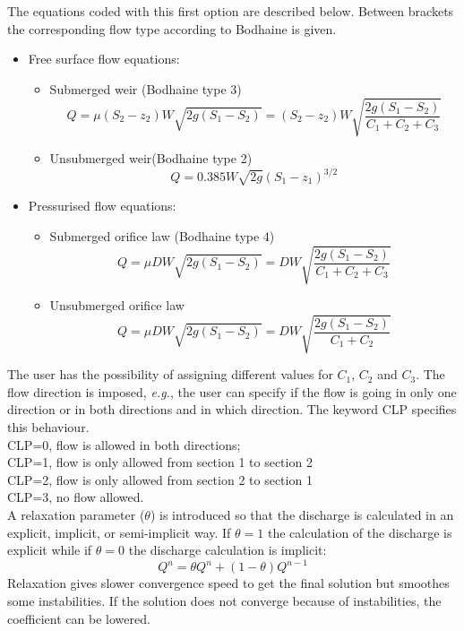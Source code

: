 The equations coded with this first option are described below.
Between brackets the corresponding flow type according to Bodhaine \cite{Bodhaine1968} is given.
\begin{itemize}
\item Free surface flow equations:
  \begin{itemize}
  \item Submerged weir (Bodhaine type 3)
    \begin{equation}
      Q=\mu (S_2-z_2) W \sqrt{2g(S_1-S_2 )} = (S_2-z_2) W \sqrt{\dfrac{2g(S_1-S_2)}{C_1+C_2+C_3}}
    \end{equation}
  \item Unsubmerged weir(Bodhaine type 2)
    \begin{equation}
      Q=0.385 W \sqrt{2g}(S_1-z_1)^{3/2}
    \end{equation}
  \end{itemize}
\item Pressurised flow equations:
  \begin{itemize}
  \item Submerged orifice law (Bodhaine type 4)
    \begin{equation}
      Q=\mu D W \sqrt{2g(S_1-S_2 )} = D W \sqrt{\dfrac{2g(S_1-S_2)}{C_1+C_2+C_3}}
    \end{equation}
  \item Unsubmerged orifice law
    \begin{equation}
    Q= \mu D W \sqrt{2g(S_1-S_2)} = D W \sqrt{\dfrac{2g(S_1-S_2)}{C_1+C_2}}
    \end{equation}
  \end{itemize}
\end{itemize}

The user has the possibility of assigning different values for $C_1$, $C_2$ and $C_3$.
The flow direction is imposed, \textit{e.g.}, the user can specify if the flow is going
in only one direction or in both directions and in which direction.
The keyword CLP specifies this behaviour.\\
CLP=0, flow is allowed in both directions;\\
CLP=1, flow is only allowed from section 1 to section 2\\
CLP=2, flow is only allowed from section 2 to section 1\\
CLP=3, no flow allowed.\\
A relaxation parameter ($\theta$) is introduced so that the discharge is calculated
in an explicit, implicit, or semi-implicit way.
If $\theta=1$ the calculation of the discharge is explicit while if $\theta=0$
the discharge calculation is implicit:
\begin{equation}
  Q^n=\theta Q^n + (1-\theta) Q^{n-1}
\end{equation}
Relaxation gives slower convergence speed to get the final solution
but smoothes some instabilities.
If the solution does not converge because of instabilities, the coefficient can be lowered.

